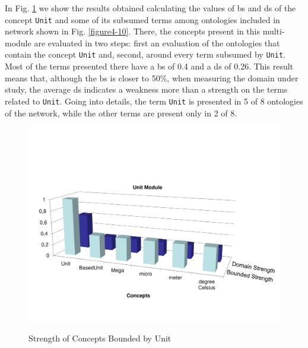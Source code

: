 In Fig. \ref{figure4-16} we show the results obtained calculating the values of \gls{bs} and \gls{ds}  of the concept \texttt{Unit}   and some of its subsumed terms among ontologies included in network  shown in Fig. \ref{figure4-10}. There, the concepts present in this multi-module are evaluated in two steps: first an evaluation of the ontologies that contain the concept \texttt{Unit} and, second, around every term subsumed by \texttt{Unit}. Most of the terms presented there have a \gls{bs} of 0.4 and a \gls{ds} of 0.26. This result means that, although the \gls{bs} is closer to 50\%, when measuring the domain under study, the average \gls{ds} indicates a weakness more than a strength on the terms related to \texttt{Unit}. Going into details, the term \texttt{Unit} is presented in 5 of 8 ontologies of the network, while the other terms are present only in 2 of 8. 


\begin{figure}
\begin{center}
	\includegraphics[scale=0.5]{figure-chapterIV/fig4-16.pdf}\\
	\caption{Strength of Concepts Bounded by Unit}
	\label{figure4-16}
\end{center}
\end{figure}

